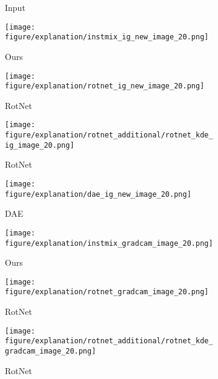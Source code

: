 \documentclass{article} \usepackage{iclr2021_conference,times}
\begin{document}
\begin{figure}[t]
\begin{subfigure}{.11\textwidth}
  \caption{Input}
\end{subfigure}
\hspace{-2mm}
\begin{subfigure}{.11\textwidth}
  \centering
  \texttt{[image: figure/explanation/instmix\_ig\_new\_image\_20.png]}
  \caption{Ours}
  \label{fig:visual_explanation_ours_IG}
\end{subfigure}
\hspace{-2mm}
\begin{subfigure}{.11\textwidth}
  \centering
  \texttt{[image: figure/explanation/rotnet\_ig\_new\_image\_20.png]}
  \caption{RotNet}
  \label{fig:visual_explanation_rotnet_IG}
\end{subfigure}
\hspace{-2mm}
\begin{subfigure}{.11\textwidth}
  \centering
  \texttt{[image: figure/explanation/rotnet\_additional/rotnet\_kde\_ig\_image\_20.png]}
  \caption{RotNet}
  \label{fig:visual_explanation_rotnet_kde_IG}
\end{subfigure}
\hspace{-2mm}
\begin{subfigure}{.11\textwidth}
  \centering
  \texttt{[image: figure/explanation/dae\_ig\_new\_image\_20.png]}
  \caption{DAE}
  \label{fig:visual_explanation_dae_IG}
\end{subfigure}
\hspace{-2mm}
\begin{subfigure}{.11\textwidth}
  \centering
  \texttt{[image: figure/explanation/instmix\_gradcam\_image\_20.png]}
  \caption{Ours}
  \label{fig:visual_explanation_ours_GradCAM}
\end{subfigure}
\hspace{-2mm}
\begin{subfigure}{.11\textwidth}
  \centering
  \texttt{[image: figure/explanation/rotnet\_gradcam\_image\_20.png]}
  \caption{RotNet}
  \label{fig:visual_explanation_rotnet_GradCAM}
\end{subfigure}
\hspace{-2mm}
\begin{subfigure}{.11\textwidth}
  \centering
  \texttt{[image: figure/explanation/rotnet\_additional/rotnet\_kde\_gradcam\_image\_20.png]}
  \caption{RotNet}
  \label{fig:visual_explanation_rotnet_kde_GradCAM}
\end{subfigure}
\hspace{-2mm}
\begin{subfigure}{.11\textwidth}

\end{subfigure}
\end{figure}
\end{document}

